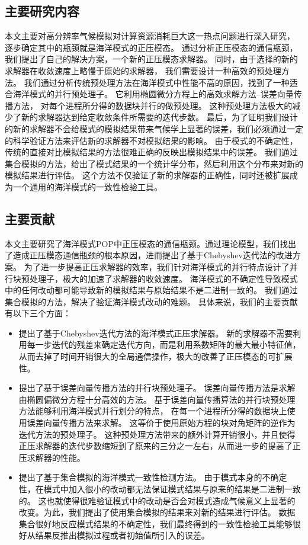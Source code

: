 \subsection{主要研究内容}
本文主要对高分辨率气候模拟对计算资源消耗巨大这一热点问题进行深入研究，
逐步确定其中的瓶颈就是海洋模式的正压模态。
通过分析正压模态的通信瓶颈，我们提出了自己的解决方案，一个新的正压模态求解器。
同时，由于选择的新的求解器在收敛速度上略慢于原始的求解器， 我们需要设计一种高效的预处理方法。
我们通过分析传统预处理方法在海洋模式中性能不高的原因，找到了一种适合海洋模式的并行预处理子。 它利用椭圆微分方程上的高效求解方法--误差向量传播方法， 对每个进程所分得的数据块并行的做预处理。 
这种预处理方法极大的减少了新的求解器达到给定收敛条件所需要的迭代步数。
最后，为了证明我们设计的新的求解器不会给模式的模拟结果带来气候学上显著的误差，我们必须通过一定的科学验证方法来评估新的求解器不对模拟结果的影响。 
由于模式的不确定性，传统的直接对比模拟结果的方法很难正确的反映出模拟结果中的误差。
我们通过集合模拟的方法，给出了模式结果的一个统计学分布，然后利用这个分布来对新的模拟结果进行评估。
这个方法不仅验证了新的求解器的正确性，同时还被扩展成为一个通用的海洋模式的一致性检验工具。 

\subsection{主要贡献}
本文主要研究了海洋模式POP中正压模态的通信瓶颈。通过理论模型，我们找出了造成正压模态通信瓶颈的根本原因，进而提出了基于Chebyshev迭代法的改进方案。
为了进一步提高正压求解器的效率，我们针对海洋模式的并行特点设计了并行块预处理子，极大的加速了求解器的收敛速度。
海洋模式的不确定性导致模式中的任何改动都可能导致新的模拟结果与原始结果不是二进制一致的。
我们通过集合模拟的方法，解决了验证海洋模式改动的难题。
具体来说，我们的主要贡献有以下三个方面：
\begin{itemize}
 	\item {\kaishu 提出了基于Chebyshev迭代方法的海洋模式正压求解器。} 
 	新的求解器不需要利用每一步迭代的残差来确定迭代方向，而是利用系数矩阵的最大最小特征值，
 	从而去掉了时间开销很大的全局通信操作，极大的改善了正压模态的可扩展性。
    \item {\kaishu 提出了基于误差向量传播方法的并行块预处理子。}
    误差向量传播方法是求解由椭圆偏微分方程十分高效的方法。
    基于误差向量传播算法的并行块预处理方法能够利用海洋模式并行划分的特点，
    在每一个进程所分得的数据块上使用误差向量传播方法来求解。
    这等价于使用原始方程的块对角矩阵的逆作为迭代方法的预处理子。
    这种预处理方法带来的额外计算开销很小，并且使得正压求解器的迭代步数缩短到了原来的三分之一左右，从而进一步的提高了正压求解器的性能。
    \item {\kaishu 提出了基于集合模拟的海洋模式一致性检测方法。}
    由于模式本身的不确定性，在模式中加入很小的改动都无法保证模式结果与原来的结果是二进制一致的。
    这也就使得很难验证模式中的改动是否会对模式造成气候意义上显著的改变。为此，我们提出了使用集合模拟的结果来对新的结果进行评估。 数据集合很好地反应模式结果的不确定性，我们最终得到的一致性检验工具能够很好从结果反推出模拟过程或者初始值所引入的误差。  
\end{itemize}

